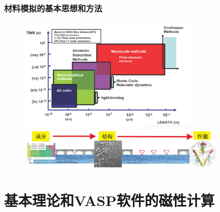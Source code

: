 \documentclass[cjk,slidestop,compress,mathserif,blue]{beamer}
\begin{document}
\frame
{
	\frametitle{材料模拟的基本思想和方法}
\begin{figure}[h!]
\vspace*{-0.20in}
\centering
\includegraphics[height=2.20in,width=3.45in]{Figures/Multi-Scale-6.png}
\vskip 0.05pt
\includegraphics[height=0.80in,width=4.05in]{Figures/MGE-2.png}
\label{Multi-Scale}
\end{figure}
}

\section{基本理论和\rm{VASP}软件的磁性计算}
\end{document}
